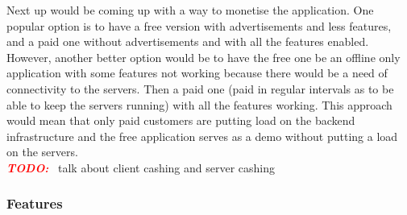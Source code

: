\documentclass{article}
\newcommand{\vspaceconst}{-2ex}
\newcommand{\TODO}{\textbf{\textit{\textcolor{red}{TODO:}}} }
\begin{document}
\begin{multicols}{2}
Next up would be coming up with a way to monetise the application. One popular option is to have a free version with advertisements and less features, and a paid one without advertisements and with all the features enabled. However, another better option would be to have the free one be an offline only application with some features not working because there would be a need of connectivity to the servers. Then a paid one (paid in regular intervals as to be able to keep the servers running) with all the features working. This approach would mean that only paid customers are putting load on the backend infrastructure and the free application serves as a demo without putting a load on the servers.\\
\TODO~talk about client cashing and server cashing\\

\subsubsection{Features}
\vspace{\vspaceconst}


\end{multicols}
\end{document}
